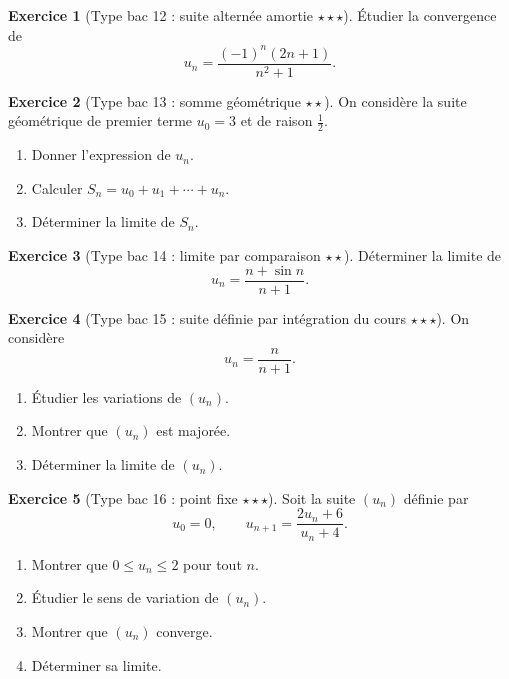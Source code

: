 \documentclass[11pt,a4paper]{article}
\theoremstyle{definition}
\newtheorem{exercice}{Exercice}[section]
\newcommand{\etoile}[1]{\hfill{\small\textbf{#1}}}
\begin{document}
\begin{exercice}[Type bac 12 : suite alternée amortie \etoile{$\star\star\star$}]
Étudier la convergence de
\[
u_n=\frac{(-1)^n(2n+1)}{n^2+1}.
\]
\end{exercice}

\begin{exercice}[Type bac 13 : somme géométrique \etoile{$\star\star$}]
On considère la suite géométrique de premier terme $u_0=3$ et de raison $\frac12$.
\begin{enumerate}[label=\arabic*.]
    \item Donner l'expression de $u_n$.
    \item Calculer $S_n=u_0+u_1+\cdots+u_n$.
    \item Déterminer la limite de $S_n$.
\end{enumerate}
\end{exercice}

\begin{exercice}[Type bac 14 : limite par comparaison \etoile{$\star\star$}]
Déterminer la limite de
\[
u_n=\frac{n+\sin n}{n+1}.
\]
\end{exercice}

\begin{exercice}[Type bac 15 : suite définie par intégration du cours \etoile{$\star\star\star$}]
On considère
\[
u_n=\frac{n}{n+1}.
\]
\begin{enumerate}[label=\arabic*.]
    \item Étudier les variations de $(u_n)$.
    \item Montrer que $(u_n)$ est majorée.
    \item Déterminer la limite de $(u_n)$.
\end{enumerate}
\end{exercice}

\begin{exercice}[Type bac 16 : point fixe \etoile{$\star\star\star$}]
Soit la suite $(u_n)$ définie par
\[
u_0=0,\qquad u_{n+1}=\frac{2u_n+6}{u_n+4}.
\]
\begin{enumerate}[label=\arabic*.]
    \item Montrer que $0\le u_n\le 2$ pour tout $n$.
    \item Étudier le sens de variation de $(u_n)$.
    \item Montrer que $(u_n)$ converge.
    \item Déterminer sa limite.
\end{enumerate}
\end{exercice}
\end{document}
